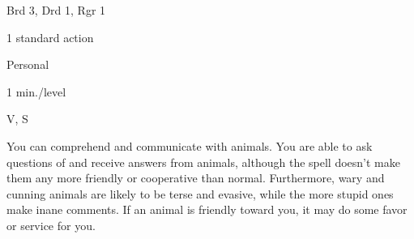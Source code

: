 
\begin{description*}
\item[Level:] Brd 3, Drd 1, Rgr 1
\item[Casting Time:] 1 standard action
\item[Range:] Personal
\item[Duration:] 1 min./level
\item[Components:] V, S
\end{description*}

You can comprehend and communicate with animals. You are able to ask questions
of and receive answers from animals, although the spell doesn't make them any more
friendly or cooperative than normal. Furthermore, wary and cunning animals are
likely to be terse and evasive, while the more stupid ones make inane comments.
If an animal is friendly toward you, it may do some favor or service for you.